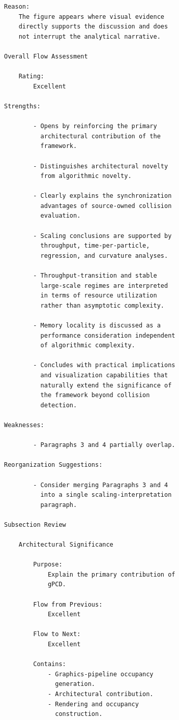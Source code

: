 \begin{verbatim}
Reason:
    The figure appears where visual evidence
    directly supports the discussion and does
    not interrupt the analytical narrative.

Overall Flow Assessment

    Rating:
        Excellent

Strengths:

        - Opens by reinforcing the primary
          architectural contribution of the
          framework.

        - Distinguishes architectural novelty
          from algorithmic novelty.

        - Clearly explains the synchronization
          advantages of source-owned collision
          evaluation.

        - Scaling conclusions are supported by
          throughput, time-per-particle,
          regression, and curvature analyses.

        - Throughput-transition and stable
          large-scale regimes are interpreted
          in terms of resource utilization
          rather than asymptotic complexity.

        - Memory locality is discussed as a
          performance consideration independent
          of algorithmic complexity.

        - Concludes with practical implications
          and visualization capabilities that
          naturally extend the significance of
          the framework beyond collision
          detection.

Weaknesses:

        - Paragraphs 3 and 4 partially overlap.

Reorganization Suggestions:

        - Consider merging Paragraphs 3 and 4
          into a single scaling-interpretation
          paragraph.

Subsection Review

    Architectural Significance

        Purpose:
            Explain the primary contribution of
            gPCD.

        Flow from Previous:
            Excellent

        Flow to Next:
            Excellent

        Contains:
            - Graphics-pipeline occupancy
              generation.
            - Architectural contribution.
            - Rendering and occupancy
              construction.


\end{verbatim}
